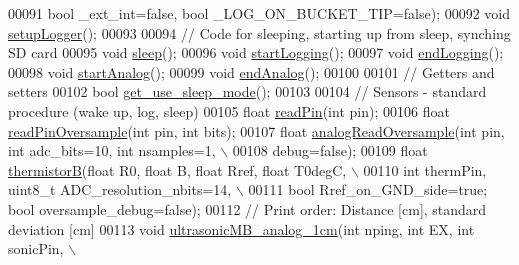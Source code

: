 \begin{DoxyCode}
00091          \textcolor{keywordtype}{bool} \_ext\_int=\textcolor{keyword}{false}, \textcolor{keywordtype}{bool} \_LOG\_ON\_BUCKET\_TIP=\textcolor{keyword}{false});
00092     \textcolor{keywordtype}{void} \hyperlink{classLogger_ab5e0bd543758c65a17b77553a0e9f0c9}{setupLogger}();
00093     
00094     \textcolor{comment}{// Code for sleeping, starting up from sleep, synching SD card}
00095     \textcolor{keywordtype}{void} \hyperlink{classLogger_ad90ff8f29410f6b70cc6334391400a4e}{sleep}();
00096     \textcolor{keywordtype}{void} \hyperlink{classLogger_a4a6c78dd1715b33ae4bbd6f66f116f77}{startLogging}();
00097     \textcolor{keywordtype}{void} \hyperlink{classLogger_aa82814d61687debcf3b8dd6f46c9d549}{endLogging}();
00098     \textcolor{keywordtype}{void} \hyperlink{classLogger_af936c7f58e23316abb5614cbd31c7ced}{startAnalog}();
00099     \textcolor{keywordtype}{void} \hyperlink{classLogger_adca7be8a63592263c67f63766680d16f}{endAnalog}();
00100     
00101     \textcolor{comment}{// Getters and setters}
00102     \textcolor{keywordtype}{bool} \hyperlink{classLogger_acc758b6fdaac8099c492929aa7f1691d}{get\_use\_sleep\_mode}();
00103     
00104     \textcolor{comment}{// Sensors - standard procedure (wake up, log, sleep)}
00105     \textcolor{keywordtype}{float} \hyperlink{classLogger_a343fcabefb37e06429865a2e6a6e708a}{readPin}(\textcolor{keywordtype}{int} pin);
00106     \textcolor{keywordtype}{float} \hyperlink{classLogger_a4e67526c65fa865f276a515a200af4aa}{readPinOversample}(\textcolor{keywordtype}{int} pin, \textcolor{keywordtype}{int} bits);
00107     \textcolor{keywordtype}{float} \hyperlink{classLogger_a73193a90982ddcb31ad0b401ec0e71fa}{analogReadOversample}(\textcolor{keywordtype}{int} pin, \textcolor{keywordtype}{int} adc\_bits=10, \textcolor{keywordtype}{int} nsamples=1, \(\backslash\)
00108           debug=\textcolor{keyword}{false});
00109     \textcolor{keywordtype}{float} \hyperlink{classLogger_a343dbf1edb8745ea9672f579d3e8297e}{thermistorB}(\textcolor{keywordtype}{float} R0, \textcolor{keywordtype}{float} B, \textcolor{keywordtype}{float} Rref, \textcolor{keywordtype}{float} T0degC, \(\backslash\)
00110           \textcolor{keywordtype}{int} thermPin, uint8\_t ADC\_resolution\_nbits=14, \(\backslash\)
00111           \textcolor{keywordtype}{bool} Rref\_on\_GND\_side=\textcolor{keyword}{true}; \textcolor{keywordtype}{bool} oversample\_debug=\textcolor{keyword}{false});
00112     \textcolor{comment}{// Print order: Distance [cm], standard deviation [cm]}
00113     \textcolor{keywordtype}{void} \hyperlink{classLogger_a362a1462166d63ddc613eaa1e86f9854}{ultrasonicMB\_analog\_1cm}(\textcolor{keywordtype}{int} nping, \textcolor{keywordtype}{int} EX, \textcolor{keywordtype}{int} sonicPin, \(\backslash\)

\end{DoxyCode}
